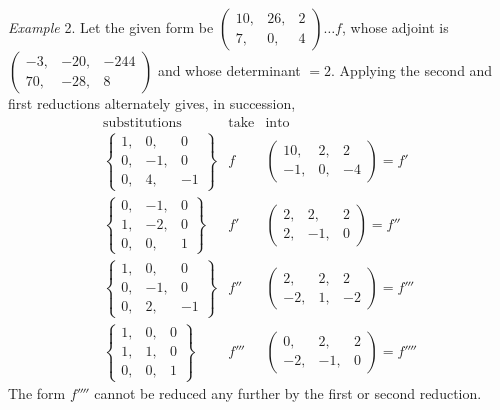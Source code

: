 \emph{Example} 2. Let the given form be \(\left(\begin{smallmatrix}10,&26,&2\\7,&0,&4\end{smallmatrix}\right)\ldots f\), whose adjoint is \(\left(\begin{smallmatrix}-3,&-20,&-244\\70,&-28,&8\end{smallmatrix}\right)\) and whose determinant \(=2\). Applying the second and first reductions alternately gives, in succession,
\[
\begin{array}{c|c|c}
\text{substitutions}&\text{take}&\text{into}\\[3pt]
\left\{\begin{smallmatrix}1,&0,&0\\0,&-1,&0\\0,&4,&-1\end{smallmatrix}\right\}
&f&\left(\begin{smallmatrix}10,&2,&2\\-1,&0,&-4\end{smallmatrix}\right)=f'\\[6pt]
\left\{\begin{smallmatrix}0,&-1,&0\\1,&-2,&0\\0,&0,&1\end{smallmatrix}\right\}
&f'&\left(\begin{smallmatrix}2,&2,&2\\2,&-1,&0\end{smallmatrix}\right)=f''\\[6pt]
\left\{\begin{smallmatrix}1,&0,&0\\0,&-1,&0\\0,&2,&-1\end{smallmatrix}\right\}
&f''&\left(\begin{smallmatrix}2,&2,&2\\-2,&1,&-2\end{smallmatrix}\right)=f'''\\[6pt]
\left\{\begin{smallmatrix}1,&0,&0\\1,&1,&0\\0,&0,&1\end{smallmatrix}\right\}
&f'''&\left(\begin{smallmatrix}0,&2,&2\\-2,&-1,&0\end{smallmatrix}\right)=f''''
\end{array}
\]
The form \(f''''\) cannot be reduced any further by the first or second reduction.


